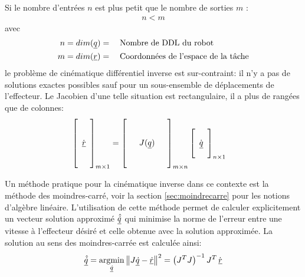 Si le nombre d'entrées $n$ est plus petit que le nombre de sorties $m$ : 
\begin{align}
n < m
\end{align} 
avec 
\begin{align}
n &= dim(\underline{q}) = \quad\text{Nombre de DDL du robot} \\
m &= dim(\underline{r}) = \quad\text{Coordonnées de l'espace de la tâche} 
\end{align} 
le problème de cinématique différentiel inverse est sur-contraint: il n'y a pas de solutions exactes possibles sauf pour un sous-ensemble de déplacements de l'effecteur. Le Jacobien d'une telle situation est rectangulaire, il a plus de rangées que de colonnes:
\begin{align}
\left[ \begin{array}{c}  \\ \\ \dot{\underline{r}} \\ \\ \\ 
\end{array} \right]_{m \times 1}
&= 
\left[ \begin{array}{c c c} 
&&\\
&&\\
& J(\underline{q}) &\\
&&\\
&&
\end{array} \right]_{m \times n}
\left[ \begin{array}{c} 
\\ \dot{\underline{q}} \\ \\
\end{array} \right]_{n \times 1}
\label{eq:uoverconstraintdiffkin}
\end{align} 

Un méthode pratique pour la cinématique inverse dans ce contexte est la méthode des moindres-carré, voir la section \ref{sec:moindrecarre} pour les notions d'algèbre linéaire. L'utilisation de cette méthode permet de calculer explicitement un vecteur solution approximé $\underline{\hat{\dot{q}}}$ qui minimise la norme de l'erreur entre une vitesse à l'effecteur désiré et celle obtenue avec la solution approximée. La solution au sens des moindres-carrée est calculée ainsi:
\begin{align}
\col{\hat{\dot{q}}} = \operatornamewithlimits{argmin}\limits_{\col{\dot{q}}} \left\| J \col{\dot{q}} - \col{\dot{r}} \right\|^2 = \left( J^T J\right)^{-1} J^T \, \dot{\col{r}}
\label{eq:overconstraintdiffkinleastsquare}
\end{align} 



